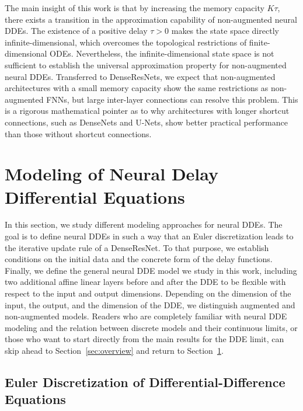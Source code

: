 \documentclass[10pt]{article}
\numberwithin{equation}{section}
\begin{document}
	The main insight of this work is that by increasing the memory capacity $K\tau$, there exists a transition in the approximation capability of non-augmented neural DDEs. The existence of a positive delay $\tau >0$ makes the state space directly infinite-dimensional, which overcomes the topological restrictions of finite-dimensional ODEs. Nevertheless, the infinite-dimensional state space is not sufficient to establish the universal approximation property for non-augmented neural DDEs. Transferred to DenseResNets, we expect that non-augmented architectures with a small memory capacity show the same restrictions as non-augmented FNNs, but large inter-layer connections can resolve this problem. This is a rigorous mathematical pointer as to why architectures with longer shortcut connections, such as DenseNets and U-Nets, show better practical performance than those without shortcut connections. 
	
	
	
	
	\section{Modeling of Neural Delay Differential Equations}
	\label{sec:modeling}
	
	In this section, we study different modeling approaches for neural DDEs. The goal is to define neural DDEs in such a way that an Euler discretization leads to the iterative update rule of a DenseResNet. To that purpose, we establish conditions on the initial data and the concrete form of the delay functions. Finally, we define the general neural DDE model we study in this work, including two additional affine linear layers before and after the DDE to be flexible with respect to the input and output dimensions. Depending on the dimension of the input, the output, and the dimension of the DDE, we distinguish augmented and non-augmented models. Readers who are completely familiar with neural DDE modeling and the relation between discrete models and their continuous limits, or those who want to start directly from the main results for the DDE limit, can skip ahead to Section~\ref{sec:overview} and return to Section~\ref{sec:modeling}.  
	
	\subsection{Euler Discretization of Differential-Difference Equations}
	\label{sec:modeling_discretization}
	
\end{document}
